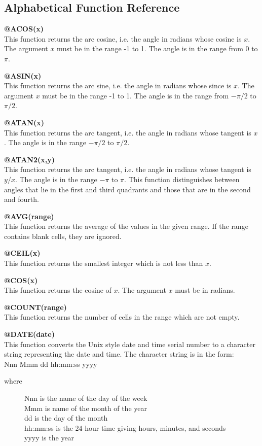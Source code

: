 \subsection*{Alphabetical Function Reference}

{\bf @ACOS(x)}\\
    This function returns the arc cosine, i.e. the angle in radians whose 
cosine is $x$.  The argument $x$ must be in the range -1 to 1.  
The angle is in the range from 
0 to $\pi$.

{\bf @ASIN(x)}\\
    This function returns the arc sine, i.e. the angle in radians whose since 
is $x$.  The argument $x$ must be in the range -1 to 1.  The angle is in the range from 
$-\pi/2$ to $\pi/2$.

{\bf @ATAN(x)}\\
    This function returns the arc tangent, i.e. the angle in radians whose 
tangent is $x$.  The angle is in the range $-\pi/2$ to $\pi/2$.

{\bf @ATAN2(x,y)}\\
This function returns the arc tangent, i.e. the angle in radians whose
tangent is $y/x$.  The angle is in the range $-\pi$ to $\pi$.  This function
distinguishes between angles that lie in the first and third quadrants and
those that are in the second and fourth.

{\bf @AVG(range)}\\
    This function returns the average of the values in the given range.  If 
the range contains blank cells, they are ignored.

{\bf @CEIL(x)}\\
    This function returns the smallest integer which is not less than $x$.

{\bf @COS(x)}\\
    This function returns the cosine of $x$.  The argument $x$ must 
    be in radians.

{\bf @COUNT(range)}\\
    This function returns the number of cells in the range which are not 
empty.

{\bf @DATE(date)}\\
    This function converts the Unix style date and time serial number to a 
character string representing the date and time.  The character string is in 
the form:\\
    Nnn Mmm dd hh:mm:ss yyyy
\begin{description}
\item[where]{Nnn is the name of the day of the week\\
        Mmm is name of the month of the year\\
        dd is the day of the month\\
        hh:mm:ss is the 24-hour time giving hours, minutes, and seconds\\
        yyyy is the year}
\end{description}

